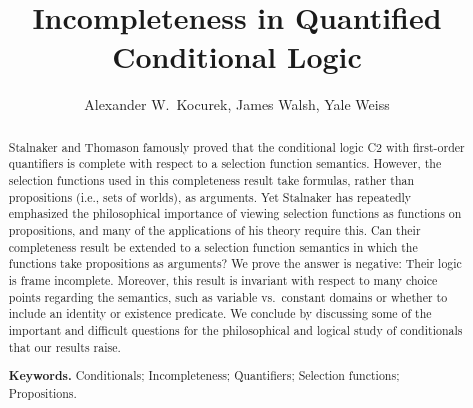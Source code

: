 \documentclass[12pt]{article}
\title{Incompleteness in Quantified Conditional Logic}
\author{Alexander W.\ Kocurek, James Walsh, Yale Weiss}
\date{}
\begin{document}
\maketitle

\begin{abstract}
    Stalnaker and Thomason famously proved that the conditional logic \textsf{C2} with first-order quantifiers is complete with respect to a selection function semantics. 
    However, the selection functions used in this completeness result take formulas, rather than propositions (i.e., sets of worlds), as arguments. 
    Yet Stalnaker has repeatedly emphasized the philosophical importance of viewing selection functions as functions on propositions, and many of the applications of his theory require this. 
    Can their completeness result be extended to a selection function semantics in which the functions take propositions as arguments? 
    We prove the answer is negative: Their logic is frame incomplete. 
    Moreover, this result is invariant with respect to many choice points regarding the semantics, such as variable vs.~constant domains or whether to include an identity or existence predicate. We conclude by discussing some of the important and difficult questions for the philosophical and logical study of conditionals that our results raise.


    \bigskip\noindent\textbf{Keywords.} Conditionals; Incompleteness; Quantifiers; Selection functions; Propositions.
\end{abstract}

\end{document}
